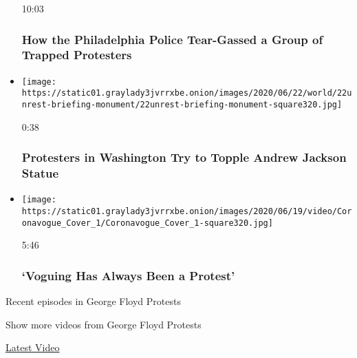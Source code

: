 \begin{itemize}
  10:03

  \hypertarget{how-the-philadelphia-police-tear-gassed-a-group-of-trapped-protesters}{%
  \subsubsection{How the Philadelphia Police Tear-Gassed a Group of
  Trapped
  Protesters}\label{how-the-philadelphia-police-tear-gassed-a-group-of-trapped-protesters}}
\item
  \href{https://www.nytimes3xbfgragh.onion/video/us/100000007205037/washington-protests-andrew-jackson-statue.html?action=click\&module=video-series-bar\&region=header\&pgtype=Article\&playlistId=video/minneapolis-george-floyd-death-video}{}

  \texttt{[image: https://static01.graylady3jvrrxbe.onion/images/2020/06/22/world/22unrest-briefing-monument/22unrest-briefing-monument-square320.jpg]}

  0:38

  \hypertarget{protesters-in-washington-try-to-topple-andrew-jackson-statue}{%
  \subsubsection{Protesters in Washington Try to Topple Andrew Jackson
  Statue}\label{protesters-in-washington-try-to-topple-andrew-jackson-statue}}
\item
  \href{https://www.nytimes3xbfgragh.onion/video/arts/100000007180242/voguing-protests.html?action=click\&module=video-series-bar\&region=header\&pgtype=Article\&playlistId=video/minneapolis-george-floyd-death-video}{}

  \texttt{[image: https://static01.graylady3jvrrxbe.onion/images/2020/06/19/video/Coronavogue\_Cover\_1/Coronavogue\_Cover\_1-square320.jpg]}

  5:46

  \hypertarget{voguing-has-always-been-a-protest}{%
  \subsubsection{`Voguing Has Always Been a
  Protest'}\label{voguing-has-always-been-a-protest}}
\end{itemize}

Recent episodes in George Floyd Protests

Show more videos from George Floyd Protests

\href{/video}{}

\href{/video/latest-video}{Latest Video}

